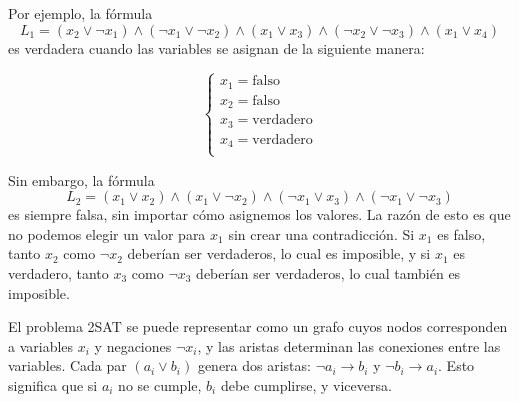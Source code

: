 Por ejemplo, la fórmula
\[
L_1 = (x_2 \lor \lnot x_1) \land
      (\lnot x_1 \lor \lnot x_2) \land
      (x_1 \lor x_3) \land
      (\lnot x_2 \lor \lnot x_3) \land
      (x_1 \lor x_4)
\]
es verdadera cuando las variables se asignan de la siguiente manera:

\[
\begin{cases}
x_1 = \textrm{falso} \\
x_2 = \textrm{falso} \\
x_3 = \textrm{verdadero} \\
x_4 = \textrm{verdadero} \\
\end{cases}
\]

Sin embargo, la fórmula
\[
L_2 = (x_1 \lor x_2) \land
      (x_1 \lor \lnot x_2) \land
      (\lnot x_1 \lor x_3) \land
      (\lnot x_1 \lor \lnot x_3)
\]
es siempre falsa, sin importar cómo
asignemos los valores.
La razón de esto es que no podemos
elegir un valor para $x_1$
sin crear una contradicción.
Si $x_1$ es falso, tanto $x_2$ como $\lnot x_2$
deberían ser verdaderos, lo cual es imposible,
y si $x_1$ es verdadero, tanto $x_3$ como $\lnot x_3$
deberían ser verdaderos, lo cual también es imposible.

El problema 2SAT se puede representar como un grafo
cuyos nodos corresponden a
variables $x_i$ y negaciones $\lnot x_i$,
y las aristas determinan las conexiones
entre las variables.
Cada par $(a_i \lor b_i)$ genera dos aristas:
$\lnot a_i \to b_i$ y $\lnot b_i \to a_i$.
Esto significa que si $a_i$ no se cumple,
$b_i$ debe cumplirse, y viceversa.

